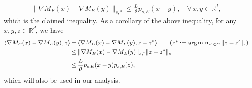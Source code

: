 \documentclass[11 pt]{article}
\begin{document}
\begin{enumerate}[(1)]
\begin{align*}
			\| \nabla M_E(x) - \nabla M_E(y) \|_{s,*} \leq \frac{L}{\theta} p_{s,E}(x-y),\quad \forall\,x,y\in\mathbb{R}^d,
		\end{align*}
		which is the claimed inequality. As a corollary of the above inequality, for any $x,y,z\in\mathbb{R}^d$, we have
		\begin{align}
			\langle \nabla M_E(x) - \nabla M_E(y), z \rangle=\,&\langle \nabla M_E(x) - \nabla M_E(y), z-z^* \rangle\tag{$z^*:=\arg\min_{z'\in E}\|z-z'\|_s$}\nonumber\\
			\leq\,& \|\nabla M_E(x) - \nabla M_E(y)\|_{s,^*}\|z-z^*\|_s\nonumber\\
			\leq \,&\frac{L}{\theta} p_{s,E}(x-y)p_{s,E}(z),\label{eq:moreau_extra}
		\end{align}
		which will also be used in our analysis.
	\end{enumerate}
	
	
	
	
\end{document}
